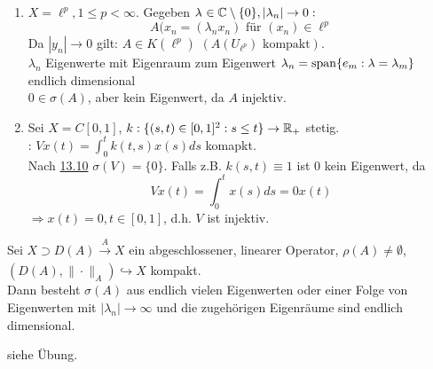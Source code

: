 \begin{beispiel}
	\begin{enumerate}[label=\alph*\upshape)]
		\item $X = \ell^{p}, 1 \leq p < \infty$. Gegeben $\lambda_{} \in \mathbb{C} \setminus \{ 0 \}, | \lambda_{n} | \rightarrow 0:$
			\[ A(x_{n} = (\lambda_{n} x_{n}) \text{ für } (x_{n}) \in \ell^{p} \]
			Da $| y_{n} | \rightarrow 0$ gilt: $A \in K(\ell^{p})$ $\left( A \left( U_{\ell^{p}} \right) \text{ kompakt} \right)$. \\
			$\lambda_{n}$ Eigenwerte mit Eigenraum zum Eigenwert $\lambda_{n} = \operatorname{span}\{ e_{m}: \lambda = \lambda_{m} \}$ endlich dimensional \\
			$0 \in \sigma(A)$, aber kein Eigenwert, da $A$ injektiv.
		\item Sei $X = C[0, 1]$, $k: \{ (s, t) \in [0, 1]^{2}: s \leq t \} \rightarrow \mathbb{R}_{+}$ stetig. \\
			: $V x(t) = \int_{0}^{t} k(t, s) x(s) ds$ komapkt. \\
			Nach \hyperref[bsp:13.10]{13.10} $\sigma(V) = \{ 0 \}$.
			Falls z.B. $k(s, t) \equiv 1$ ist $0$ kein Eigenwert, da 
			\[ V x(t) = \int_{0}^{t} x(s) ds = 0 x(t) \]
			$\Rightarrow x(t) = 0, t \in [0, 1]$, d.h. $V$ ist injektiv.
	\end{enumerate}	
\end{beispiel}


\begin{satz}
	Sei $X \supset D(A) \xrightarrow[]{A} X$ ein abgeschlossener, linearer Operator, $\rho(A) \neq \emptyset$, $(D(A), \| \cdot \|_{A}) \hookrightarrow X$ kompakt. \\
	Dann besteht $\sigma(A)$ aus endlich vielen Eigenwerten oder einer Folge von Eigenwerten mit $|\lambda_{n}| \rightarrow \infty$ und die zugehörigen Eigenräume sind endlich dimensional.
\end{satz}

\begin{beweis}
	siehe Übung.	
\end{beweis}



\newpage